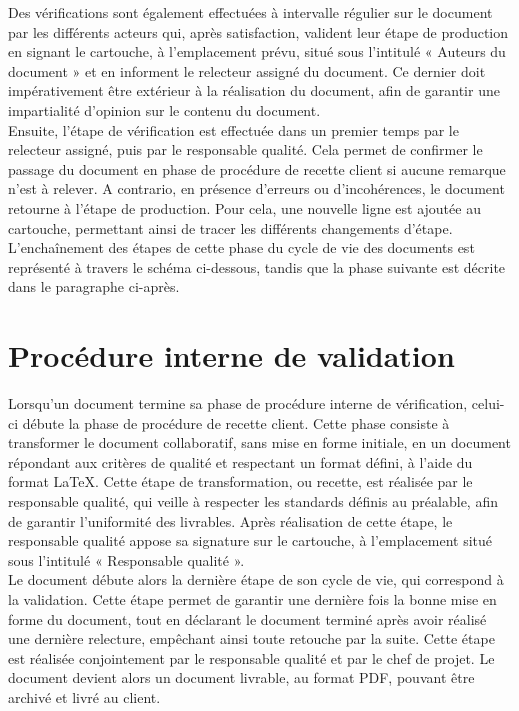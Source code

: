 Des vérifications sont également effectuées à intervalle régulier sur le document par les différents acteurs qui, après satisfaction, valident leur étape de production en signant le cartouche, à l’emplacement prévu, situé sous l’intitulé « Auteurs du document » et en informent le relecteur assigné du document. Ce dernier doit impérativement être extérieur à la réalisation du document, afin de garantir une impartialité d’opinion sur le contenu du document. \\
 
Ensuite, l’étape de vérification est effectuée dans un premier temps par le relecteur assigné, puis par le responsable qualité. Cela permet de confirmer le passage du document en phase de procédure de recette client si aucune remarque n’est à relever. A contrario, en présence d’erreurs ou d’incohérences, le document retourne à l’étape de production. Pour cela, une nouvelle ligne est ajoutée au cartouche, permettant ainsi de tracer les différents changements d’étape. \\
 
L’enchaînement des étapes de cette phase du cycle de vie des documents est représenté à travers le schéma ci-dessous, tandis que la phase suivante est décrite dans le paragraphe ci-après. \\


\section{Procédure interne de validation}
    
Lorsqu’un document termine sa phase de procédure interne de vérification, celui-ci débute la phase de procédure de recette client. Cette phase consiste à transformer le document collaboratif, sans mise en forme initiale, en un document répondant aux critères de qualité et respectant un format défini, à l’aide du format LaTeX. Cette étape de transformation, ou recette, est réalisée par le responsable qualité, qui veille à respecter les standards définis au préalable, afin de garantir l’uniformité des livrables. Après réalisation de cette étape, le responsable qualité appose sa signature sur le cartouche, à l’emplacement situé sous l’intitulé « Responsable qualité ». \\
 
Le document débute alors la dernière étape de son cycle de vie, qui correspond à la validation. Cette étape permet de garantir une dernière fois la bonne mise en forme du document, tout en déclarant le document terminé après avoir réalisé une dernière relecture, empêchant ainsi toute retouche par la suite. Cette étape est réalisée conjointement par le responsable qualité et par le chef de projet. Le document devient alors un document livrable, au format PDF, pouvant être archivé et livré au client. \\
 
